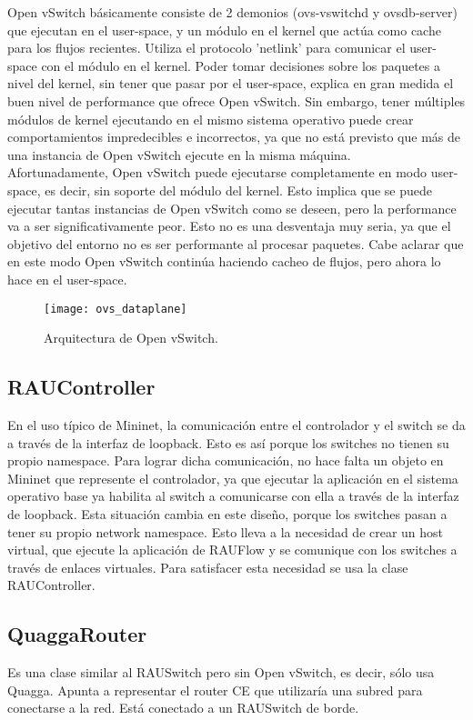 Open vSwitch básicamente consiste de 2 demonios (ovs-vswitchd y ovsdb-server) que ejecutan en el user-space, y un módulo en el kernel que actúa como cache para los flujos recientes. Utiliza el protocolo 'netlink' para comunicar el user-space con el módulo en el kernel. Poder tomar decisiones sobre los paquetes a nivel del kernel, sin tener que pasar por el user-space, explica en gran medida el buen nivel de performance que ofrece Open vSwitch. Sin embargo, tener múltiples módulos de kernel ejecutando en el mismo sistema operativo puede crear comportamientos impredecibles e incorrectos, ya que no está previsto que más de una instancia de Open vSwitch ejecute en la misma máquina.\\
Afortunadamente, Open vSwitch puede ejecutarse completamente en modo user-space, es decir, sin soporte del módulo del kernel. Esto implica que se puede ejecutar tantas instancias de Open vSwitch como se deseen, pero la performance va a ser significativamente peor. Esto no es una desventaja muy seria, ya que el objetivo del entorno no es ser performante al procesar paquetes. Cabe aclarar que en este modo Open vSwitch continúa haciendo cacheo de flujos, pero ahora lo hace en el user-space.

\begin{figure}[t]
	\caption{Arquitectura de Open vSwitch.}
	\texttt{[image: ovs\_dataplane]}
	\centering
	\label{fig:ovs_dataplane}
\end{figure}

\subsection{RAUController}
En el uso típico de Mininet, la comunicación entre el controlador y el switch se da a través de la interfaz de loopback. Esto es así porque los switches no tienen su propio namespace. Para lograr dicha comunicación, no hace falta un objeto en Mininet que represente el controlador, ya que ejecutar la aplicación en el sistema operativo base ya habilita al switch a comunicarse con ella a través de la interfaz de loopback. Esta situación cambia en este diseño, porque los switches pasan a tener su propio network namespace. Esto lleva a la necesidad de crear un host virtual, que ejecute la aplicación de RAUFlow y se comunique con los switches a través de enlaces virtuales. Para satisfacer esta necesidad se usa la clase RAUController.

\subsection{QuaggaRouter}
Es una clase similar al RAUSwitch pero sin Open vSwitch, es decir, sólo usa Quagga. Apunta a representar el router CE que utilizaría una subred para conectarse a la red. Está conectado a un RAUSwitch de borde.

